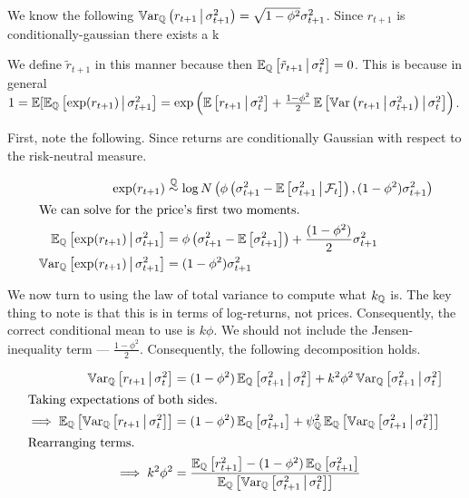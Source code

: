 \documentclass[11pt, letterpaper, twoside, final]{article}
\begin{document}
We know the following $\operatorname{\mathbb{V}ar}_{\mathbb{Q}}\left(r_{t+1} \,\middle\vert\, \sigma^2_{t+1}\right) = \sqrt{1 - \phi^2} \sigma^2_{t+1}$.
Since $r_{t+1}$ is conditionally-gaussian there exists a k

We define $\tilde{r}_{t+1}$ in this manner because then $\operatorname{\mathbb{E}}_{\mathbb{Q}}\left[\tilde{r}_{t+1} \,\middle\vert\, \sigma^2_t\right] =
0$.
This is because in general $1 = \operatorname{\mathbb{E}}[\operatorname{\mathbb{E}}_{\mathbb{Q}}\left[\exp(r_{t+1}) \,\middle\vert\, \sigma^2_{t+1}\right]  =
    \exp\left(\operatorname{\mathbb{E}}\left[r_{t+1} \,\middle\vert\, \sigma^2_t\right] + \frac{1 - \phi^2}{2}\operatorname{\mathbb{E}}\left[\operatorname{\mathbb{V}ar}\left( r_{t+1} \,\middle\vert\,
    \sigma^2_{t+1}\right) \,\middle\vert\, \sigma^2_t \right]\right)$.

First, note the following. 
Since returns are conditionally Gaussian with respect to the risk-neutral measure. 

\begin{align} 
    \label{eqn:expectations}
    \exp(r_{t+1}) &\stackrel{\QQ}{\sim} \log \N\left(\phi \left(\sigma^2_{t+1} - \E\left[\sigma^2_{t+1} \mvert
    \F_t\right]\right) , (1 - \phi^2) \sigma^2_{t+1}\right) \\
%
    \intertext{We can solve for the price's first two moments.}
    \E_{\QQ}\left[\exp(r_{t+1}) \mvert \sigma^2_{t+1} \right] &= \phi\left( \sigma^2_{t+1} -
    \E\left[\sigma^2_{t+1}\right] \right)+ \frac{(1 - \phi^2)}{2} \sigma^2_{t+1}  \\
%
    \Var_{\QQ}\left[\exp(r_{t+1}) \mvert \sigma^2_{t+1} \right] &= (1 - \phi^2) \sigma_{t+1}^2 
\end{align}


We now turn to using the law of total variance to compute what $k_{\mathbb{Q}}$ is. 
The key thing to note is that this is in terms of log-returns, not prices.
Consequently, the correct conditional mean to use is $k \phi$. 
We should not include the Jensen-inequality term --- $\frac{1 - \phi^2}{2}$.
Consequently, the following decomposition holds.


\begin{align}
    \Var_{\QQ}\left[r_{t+1} \mvert \sigma^2_t\right]  &= (1 - \phi^2) \E_{\QQ}\left[\sigma^2_{t+1} \mvert
    \sigma^2_t \right] + k^2 \phi^2 \Var_{\QQ}\left[\sigma^2_{t+1} \mvert \sigma^2_t \right]  \\
%
    \intertext{Taking expectations of both sides.}
%
    \implies \E_{\QQ}\left[\Var_{\QQ}\left[r_{t+1} \mvert \sigma^2_t\right]\right]  &= (1 - \phi^2)
    \E_{\QQ}\left[\sigma^2_{t+1} \right] + \psi_{\QQ}^2 \E_{\QQ}\left[\Var_{\QQ}\left[\sigma^2_{t+1} \mvert
    \sigma^2_t \right]\right]  \\
%
    \intertext{Rearranging terms.}
%
    \implies k^2 \phi^2 &= \frac{\E_{\QQ}\left[r^2_{t+1} \right] -  (1 - \phi^2) \E_{\QQ}\left[\sigma^2_{t+1}
    \right]}{\E_{\QQ}\left[\Var_{\QQ}\left[\sigma^2_{t+1} \mvert \sigma^2_t \right]\right]}
    \label{eqn:psi_qq_as_corr}
\end{align}
\end{document}
